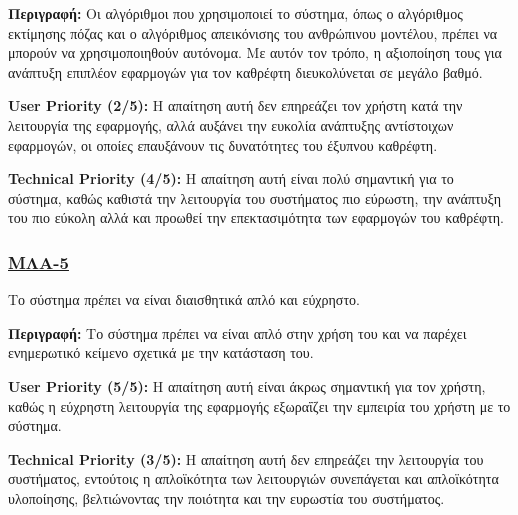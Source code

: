 \noindent\textbf{Περιγραφή:} Οι αλγόριθμοι που χρησιμοποιεί το σύστημα, όπως ο αλγόριθμος εκτίμησης πόζας και ο αλγόριθμος απεικόνισης του ανθρώπινου μοντέλου, πρέπει να μπορούν να χρησιμοποιηθούν αυτόνομα. Με αυτόν τον τρόπο, η αξιοποίηση τους για ανάπτυξη επιπλέον εφαρμογών για τον καθρέφτη διευκολύνεται σε μεγάλο βαθμό.

\noindent\textbf{User Priority (2/5):} Η απαίτηση αυτή δεν επηρεάζει τον χρήστη κατά την λειτουργία της εφαρμογής, αλλά αυξάνει την ευκολία ανάπτυξης αντίστοιχων εφαρμογών, οι οποίες επαυξάνουν τις δυνατότητες του έξυπνου καθρέφτη.

\noindent\textbf{Technical Priority (4/5):} Η απαίτηση αυτή είναι πολύ σημαντική για το σύστημα, καθώς καθιστά την λειτουργία του συστήματος πιο εύρωστη, την ανάπτυξη του πιο εύκολη αλλά και προωθεί την επεκτασιμότητα των εφαρμογών του καθρέφτη.

\subsubsection{\underline{ΜΛΑ-5}}
\noindent Το σύστημα πρέπει να είναι διαισθητικά απλό και εύχρηστο.

\noindent\textbf{Περιγραφή:} Το σύστημα πρέπει να είναι απλό στην χρήση του και να παρέχει ενημερωτικό κείμενο σχετικά με την κατάσταση του.

\noindent\textbf{User Priority (5/5):} Η απαίτηση αυτή είναι άκρως σημαντική για τον χρήστη, καθώς η εύχρηστη λειτουργία της εφαρμογής εξωραΐζει την εμπειρία του χρήστη με το σύστημα.

\noindent\textbf{Technical Priority (3/5):} Η απαίτηση αυτή δεν επηρεάζει την λειτουργία του συστήματος, εντούτοις η απλοϊκότητα των λειτουργιών συνεπάγεται και απλοϊκότητα υλοποίησης, βελτιώνοντας την ποιότητα και την ευρωστία του συστήματος.